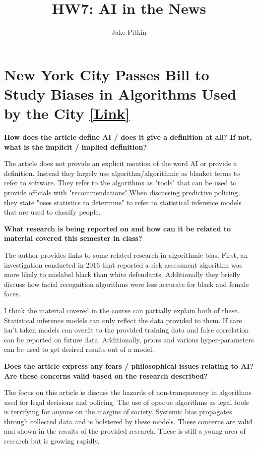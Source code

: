 \documentclass[fleqn]{hermans-hw}
\title{HW7: AI in the News}
\institute{University of Utah}
\author{Jake Pitkin}
\begin{document}
\maketitle
\section*{New York City Passes Bill to Study Biases in Algorithms Used by the City \href{https://motherboard.vice.com/en_us/article/xw4xdw/new-york-city-algorithmic-bias-bill-law}{{\bf[Link]}}} 

{\bf How does the article define AI / does it give a definition at all? If not, what is the implicit / implied definition?}

The article does not provide an explicit mention of the word AI or provide a definition. Instead they largely use algorithm/algorithmic as blanket terms to refer to software. They refer to the algorithms as "tools" that can be used to provide officials with "recommendations".When discussing predictive policing, they state "uses statistics to determine" to refer to statistical inference models that are used to classify people.

{\bf What research is being reported on and how can it be related to material covered this semester in class? }

The author provides links to some related research in algorithmic bias. First, an investigation conducted in 2016 that reported a risk assessment algorithm was more likely to mislabel black than white defendants. Additionally they briefly discuss how facial recognition algorithms were less accurate for black and female faces.

I think the material covered in the course can partially explain both of these. Statistical inference models can only reflect the data provided to them. If 
	care isn't taken models can overfit to the provided training data and false correlation can be reported on future data. Additionally, priors and various hyper-parameters can be used to get desired results out of a model.

{\bf Does the article express any fears / philosophical issues relating to AI? Are these concerns valid based on the research described? }

The focus on this article is discuss the hazards of non-transparency in algorithms used for legal decisions and policing. The use of opaque algorithms as legal tools is terrifying for anyone on the margins of society. Systemic bias propagates through collected data and is bolstered by these models. These concerns are valid and shown in the results of the provided research. These is still a young area of research but is growing rapidly.
\end{document}
